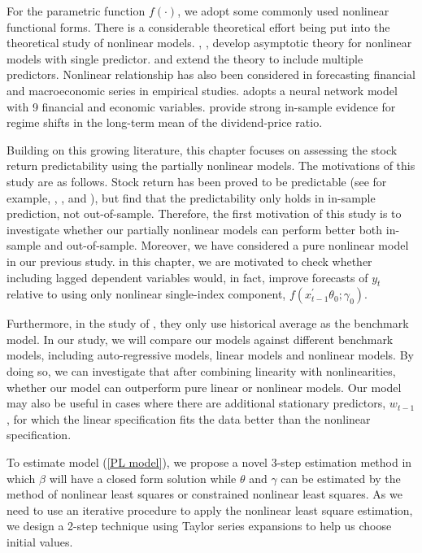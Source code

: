 \documentclass[a4paper,12pt,times,numbered,print,index]{report}
\numberwithin{equation}{section}
\begin{document}
For the parametric function $f\left(\cdot\right)$, we adopt some commonly used nonlinear functional forms. There is a considerable theoretical effort being put into the theoretical study of nonlinear models. \cite{park1999asymptotics}, \cite{park2000nonstationary}, \cite{park2001nonlinear} develop asymptotic theory for nonlinear models with single predictor. \cite{chang2001nonlinear} and \cite{chang2003index} extend the theory to include multiple predictors. Nonlinear relationship has also been considered in forecasting financial and macroeconomic series in empirical studies. \cite{qi1999nonlinear} adopts a neural network model with 9 financial and economic variables. \cite{lettau2008reconciling} provide strong in-sample evidence for regime shifts in the long-term mean of the dividend-price ratio.

Building on this growing literature, this chapter focuses on assessing the stock return predictability using the partially nonlinear models. The motivations of this study are as follows. Stock return has been proved to be predictable (see for example, \cite{fama1981stock}, \cite{fama1990stock}, \cite{campbell2004caught} and \cite{campbell2006efficient}), but \cite{welch2008comprehensive} find that the predictability only holds in in-sample prediction, not out-of-sample. Therefore, the first motivation of this study is to investigate whether our partially nonlinear models can perform better both in-sample and out-of-sample. Moreover, we have considered a pure nonlinear model in our previous study. in this chapter, we are motivated to check whether including lagged dependent variables would, in fact, improve forecasts of $y_{t}$ relative to using only nonlinear single-index component, $f\left( x_{t-1}^{\prime }\theta_0; \gamma_0\right)$. 

Furthermore, in the study of \cite{welch2008comprehensive}, they only use historical average as the benchmark model. In our study, we will compare our models against different benchmark models, including auto-regressive models, linear models and nonlinear models. By doing so, we can investigate that after combining linearity with nonlinearities, whether our model can outperform pure linear or nonlinear models. Our model may also be useful in cases where there are additional stationary predictors, $w_{t-1}$, for which the linear specification fits the data better than the nonlinear specification.

To estimate model (\ref{PL model}), we propose a novel 3-step estimation method in which $\beta$ will have a closed form solution while $\theta$ and $\gamma$ can be estimated by the method of nonlinear least squares or constrained nonlinear least squares. As we need to use an iterative procedure to apply the nonlinear least square estimation, we design a 2-step technique using Taylor series expansions to help us choose initial values. 
\end{document}
